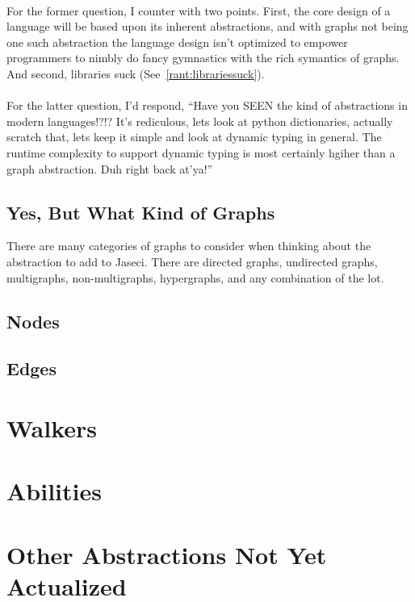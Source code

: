 \documentclass{book}
\begin{document}
\paragraph{}
For the former question, I counter with two points. First, the core design of a language will be based upon its inherent abstractions, and with graphs not being one such abstraction the language design isn't optimized to empower programmers to nimbly do fancy gymnastics with the rich symantics of graphs. And second, libraries suck (See~\ref{rant:librariessuck}).
\paragraph{}
For the latter question, I'd respond, ``Have you SEEN the kind of abstractions in modern languages!?!? It's rediculous, lets look at python dictionaries, actually scratch that, lets keep it simple and look at dynamic typing in general. The runtime complexity to support dynamic typing is most certainly hgiher than a graph abstraction. Duh right back at'ya!''
\subsection{Yes, But What Kind of Graphs}

\printfigTypes

There are many categories of graphs to consider when thinking about the abstraction to add to Jaseci. There are \gls{directed graphs}, \gls{undirected graphs}, \gls{multigraphs}, non-multigraphs, \gls{hypergraphs}, and any combination of the lot.
\subsection{Nodes}
\subsection{Edges}

\section{Walkers}
\section{Abilities}
\section{Other Abstractions Not Yet Actualized}
\end{document}
